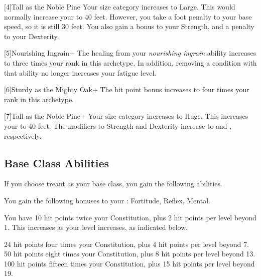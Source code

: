         [4]{Tall as the Noble Pine} Your size category increases to Large.
        This would normally increase your  to 40 feet.
        However, you take a  foot penalty to your base speed, so it is still 30 feet.
        You also gain a  bonus to your Strength, and a  penalty to your Dexterity.

        [5]{Nourishing Ingrain+} The healing from your \textit{nourishing ingrain} ability increases to three times your rank in this archetype.
        In addition, removing a condition with that ability no longer increases your fatigue level.

        [6]{Sturdy as the Mighty Oak+} The hit point bonus increases to four times your rank in this archetype.

        [7]{Tall as the Noble Pine+} Your size category increases to Huge.
        This increases your  to 40 feet.
        The modifiers to Strength and Dexterity increase to  and , respectively.

    \subsection{Base Class Abilities}
        If you choose treant as your base class, you gain the following abilities.

        You gain the following bonuses to your :  Fortitude,  Reflex,  Mental.

            You have 10 hit points \add twice your Constitution, plus 2 hit points per level beyond 1.
            This increases as your level increases, as indicated below.
            \begin{itemize}
                 24 hit points \add four times your Constitution, plus 4 hit points per level beyond 7.
                 50 hit points \add eight times your Constitution, plus 8 hit points per level beyond 13.
                 100 hit points \add fifteen times your Constitution, plus 15 hit points per level beyond 19.
            \end{itemize}

